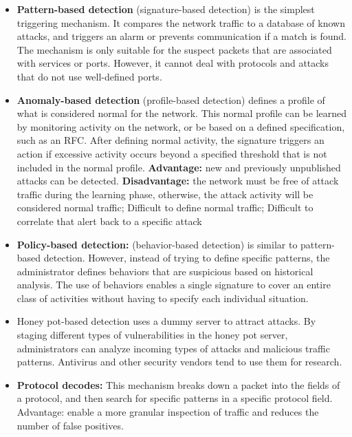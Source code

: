 \begin{itemize}
\item \textbf{Pattern-based detection} (signature-based detection) is the simplest triggering mechanism. It compares the network traffic to a database of known attacks, and triggers an alarm or prevents communication if a match is found. The mechanism is only suitable for the suspect packets that are associated with services or ports. However, it cannot deal with protocols and attacks that do not use well-defined ports.

\item \textbf{Anomaly-based detection} (profile-based detection) defines a profile of what is considered normal for the network. This normal profile can be learned by monitoring activity on the network, or be based on a defined specification, such as an RFC. After defining normal activity, the signature triggers an action if excessive activity occurs beyond a specified threshold that is not included in the normal profile. \textbf{Advantage:} new and previously unpublished attacks can be detected. \textbf{Disadvantage:} the network must be free of attack traffic during the learning phase, otherwise, the attack activity will be considered normal traffic; Difficult to define normal traffic; Difficult to correlate that alert back to a specific attack 

\item \textbf{Policy-based detection:} (behavior-based detection) is similar to pattern-based detection. However, instead of trying to define specific patterns, the administrator defines behaviors that are suspicious based on historical analysis. The use of behaviors enables a single signature to cover an entire class of activities without having to specify each individual situation.

\item Honey pot-based detection uses a dummy server to attract attacks. By staging different types of vulnerabilities in the honey pot server, administrators can analyze incoming types of attacks and malicious traffic patterns. Antivirus and other security vendors tend to use them for research.

\item \textbf{Protocol decodes:} This mechanism breaks down a packet into the fields of a protocol, and then search for specific patterns in a specific protocol field. Advantage: enable a more granular inspection of traffic and reduces the number of false positives.
\end{itemize}

